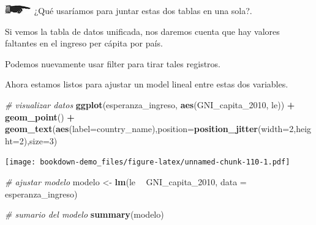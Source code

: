 \documentclass[]{book}
\newenvironment{Shaded}{\begin{snugshade}}{\end{snugshade}}
\newcommand{\KeywordTok}[1]{\textcolor[rgb]{0.13,0.29,0.53}{\textbf{#1}}}
\newcommand{\DataTypeTok}[1]{\textcolor[rgb]{0.13,0.29,0.53}{#1}}
\newcommand{\DecValTok}[1]{\textcolor[rgb]{0.00,0.00,0.81}{#1}}
\newcommand{\StringTok}[1]{\textcolor[rgb]{0.31,0.60,0.02}{#1}}
\newcommand{\CommentTok}[1]{\textcolor[rgb]{0.56,0.35,0.01}{\textit{#1}}}
\newcommand{\OperatorTok}[1]{\textcolor[rgb]{0.81,0.36,0.00}{\textbf{#1}}}
\newcommand{\NormalTok}[1]{#1}
\theoremstyle{definition}
\theoremstyle{definition}
\theoremstyle{definition}
\theoremstyle{remark}
\begin{document}
\includegraphics{./imagenes/manicule2.jpg} ¿Qué usaríamos para juntar
estas dos tablas en una sola?.

Si vemos la tabla de datos unificada, nos daremos cuenta que hay valores
faltantes en el ingreso per cápita por país.

Podemos nuevamente usar filter para tirar tales registros.

\begin{Shaded}
\end{Shaded}

Ahora estamos listos para ajustar un model lineal entre estas dos
variables.

\begin{Shaded}
\begin{Highlighting}[]
\CommentTok{# visualizar datos}
\KeywordTok{ggplot}\NormalTok{(esperanza_ingreso, }\KeywordTok{aes}\NormalTok{(GNI_capita_}\DecValTok{2010}\NormalTok{, le)) }\OperatorTok{+}\StringTok{ }
\StringTok{  }\KeywordTok{geom_point}\NormalTok{() }\OperatorTok{+}
\StringTok{  }\KeywordTok{geom_text}\NormalTok{(}\KeywordTok{aes}\NormalTok{(}\DataTypeTok{label=}\NormalTok{country_name),}\DataTypeTok{position=}\KeywordTok{position_jitter}\NormalTok{(}\DataTypeTok{width=}\DecValTok{2}\NormalTok{,}\DataTypeTok{height=}\DecValTok{2}\NormalTok{),}\DataTypeTok{size=}\DecValTok{3}\NormalTok{)}
\end{Highlighting}
\end{Shaded}

\texttt{[image: bookdown-demo\_files/figure-latex/unnamed-chunk-110-1.pdf]}

\begin{Shaded}
\begin{Highlighting}[]
\CommentTok{# ajustar modelo}
\NormalTok{modelo <-}\StringTok{ }\KeywordTok{lm}\NormalTok{(le }\OperatorTok{~}\StringTok{ }\NormalTok{GNI_capita_}\DecValTok{2010}\NormalTok{, }\DataTypeTok{data =}\NormalTok{ esperanza_ingreso)}

\CommentTok{# sumario del modelo}
\KeywordTok{summary}\NormalTok{(modelo)}
\end{Highlighting}
\end{Shaded}
\end{document}
